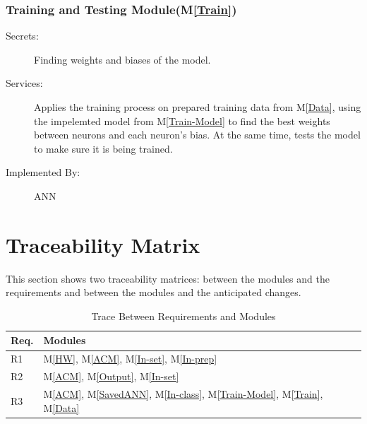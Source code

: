 \documentclass[12pt, titlepage]{article}
\newcommand{\mref}[1]{M\ref{#1}}
\begin{document}
\subsubsection{Training and Testing Module(\mref{Train})}

\begin{description}
  \item[Secrets:]Finding weights and biases of the model.
  \item[Services:]Applies the training process on prepared training data from \mref{Data}, using the impelemted model 
  from \mref{Train-Model} to find the best weights between neurons and each neuron's bias. At the same 
  time, tests the model to make sure it is being trained.
  \item[Implemented By:] ANN
\end{description}




\section{Traceability Matrix} \label{SecTM}

This section shows two traceability matrices: between the modules and the
requirements and between the modules and the anticipated changes.

\begin{table}[H]
\centering
\begin{tabular}{p{} p{}}
\toprule
\textbf{Req.} & \textbf{Modules}\\
\midrule
R1 & \mref{HW}, \mref{ACM}, \mref{In-set}, \mref{In-prep}\\
R2 & \mref{ACM}, \mref{Output}, \mref{In-set}\\
R3 & \mref{ACM}, \mref{SavedANN}, \mref{In-class}, \mref{Train-Model},
 \mref{Train}, \mref{Data}\\
\bottomrule
\end{tabular}
\caption{Trace Between Requirements and Modules}
\label{TblRT}
\end{table}
\end{document}
